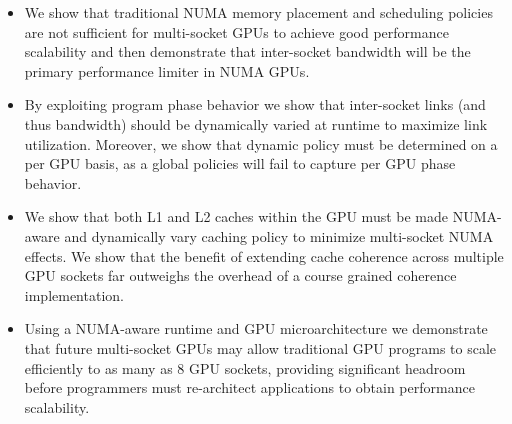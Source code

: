 \begin{itemize}

\item We show that traditional NUMA memory placement and 
scheduling policies are not sufficient for multi-socket GPUs to achieve good 
performance scalability and then demonstrate that inter-socket bandwidth will be 
the primary performance limiter in NUMA GPUs.

\item By exploiting program phase behavior we show that inter-socket links (and 
thus bandwidth) should be dynamically varied at runtime to maximize link 
utilization. Moreover, we show that dynamic policy must be determined on a per 
GPU basis, as a global policies will fail to capture per GPU phase behavior.

\item We show that both L1 and L2 caches within the GPU must be made NUMA-aware 
and dynamically vary caching policy to minimize multi-socket NUMA effects.  We 
show that the benefit of extending cache coherence across multiple GPU sockets 
far outweighs the overhead of a course grained coherence implementation.

\item Using a NUMA-aware runtime and GPU microarchitecture we demonstrate that
future  multi-socket GPUs may allow traditional GPU programs to scale efficiently to as 
many as 8 GPU sockets, providing significant headroom before programmers must 
re-architect applications to obtain performance scalability.

\end{itemize}
